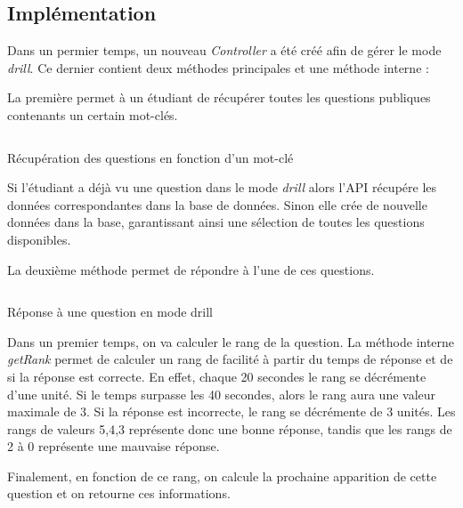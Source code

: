 \subsection{Implémentation}
Dans un permier temps, un nouveau \emph{Controller} a été créé afin de gérer le mode \emph{drill}. Ce dernier contient deux méthodes principales et une méthode interne :

La première permet à un étudiant de récupérer toutes les questions publiques contenants un certain mot-clés.

\begin{listing}[H]
    \inputminted{php}{assets/code/allQuestion.php}
    \caption{Récupération des questions en fonction d'un mot-clé}
\end{listing}
Si l'étudiant a déjà vu une question dans le mode \emph{drill} alors l'API récupére les données correspondantes dans la base de données. Sinon elle crée de nouvelle données dans la base, garantissant ainsi une sélection de toutes les questions disponibles.

La deuxième méthode permet de répondre à l'une de ces questions.
\begin{listing}[H]
    \inputminted{php}{assets/code/answerDrill.php}
    \caption{Réponse à une question en mode drill}
\end{listing}

Dans un premier temps, on va calculer le rang de la question. La méthode interne \emph{getRank} permet de calculer un rang de facilité à partir du temps de réponse et de si la réponse est correcte. En effet, chaque 20 secondes le rang se décrémente d'une unité. Si le temps surpasse les 40 secondes, alors le rang aura une valeur maximale de 3. Si la réponse est incorrecte, le rang se décrémente de 3 unités. Les rangs de valeurs 5,4,3 représente donc une bonne réponse, tandis que les rangs de 2 à 0 représente une mauvaise réponse.

Finalement, en fonction de ce rang, on calcule la prochaine apparition de cette question et on retourne ces informations.